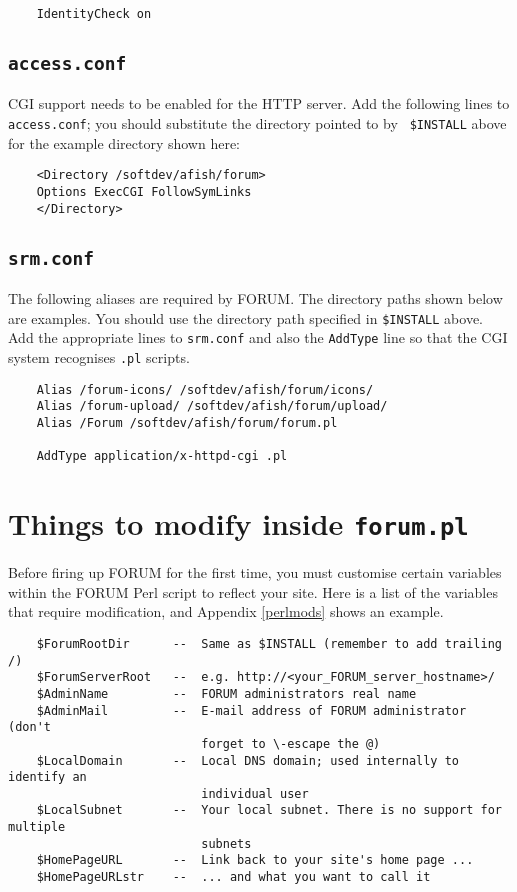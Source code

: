 \documentclass[11pt]{article}
\begin{document}
\begin{verbatim}
    IdentityCheck on
\end{verbatim}

\subsection{{\tt access.conf}}

CGI support needs to be enabled for the HTTP server. Add the following lines to
{\tt access.conf}; you should substitute the directory pointed to by {\tt
\$INSTALL} above for the example directory shown here:

\begin{verbatim}
    <Directory /softdev/afish/forum>
    Options ExecCGI FollowSymLinks
    </Directory>
\end{verbatim}


\subsection{{\tt srm.conf}}

The following aliases are required by FORUM. The directory paths shown below
are examples. You should use the directory path specified in {\tt \$INSTALL}
above. Add the appropriate lines to {\tt srm.conf} and also the {\tt AddType}
line so that the CGI system recognises {\tt .pl} scripts.

\begin{verbatim}
    Alias /forum-icons/ /softdev/afish/forum/icons/
    Alias /forum-upload/ /softdev/afish/forum/upload/
    Alias /Forum /softdev/afish/forum/forum.pl

    AddType application/x-httpd-cgi .pl
\end{verbatim}


\section{Things to modify inside {\tt forum.pl}}

Before firing up FORUM for the first time, you must customise certain variables
within the FORUM Perl script to reflect your site. Here is a list of the 
variables that require modification, and Appendix \ref{perlmods} shows an
example.

\begin{verbatim}
    $ForumRootDir      --  Same as $INSTALL (remember to add trailing /)
    $ForumServerRoot   --  e.g. http://<your_FORUM_server_hostname>/
    $AdminName         --  FORUM administrators real name
    $AdminMail         --  E-mail address of FORUM administrator (don't 
                           forget to \-escape the @)
    $LocalDomain       --  Local DNS domain; used internally to identify an
                           individual user
    $LocalSubnet       --  Your local subnet. There is no support for multiple
                           subnets
    $HomePageURL       --  Link back to your site's home page ...
    $HomePageURLstr    --  ... and what you want to call it
\end{verbatim}
\end{document}
